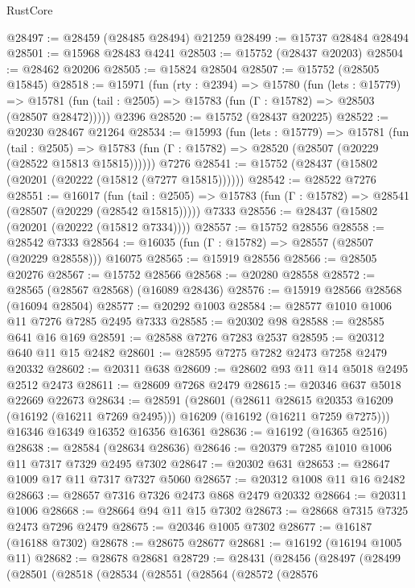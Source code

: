 \begin{lexlean}{RustCore}
\begin{coremodule}
@28497 := @28459 (@28485 @28494) @21259
@28499 := @15737 @28484 @28494
@28501 := @15968 @28483 @4241
@28503 := @15752 (@28437 @20203)
@28504 := @28462 @20206
@28505 := @15824 @28504
@28507 := @15752 (@28505 @15845)
@28518 := @15971
    (fun (rty : @2394) =>
    @15780
      (fun (lets : @15779) =>
      @15781 (fun (tail : @2505) => @15783 (fun (Γ : @15782) => @28503 (@28507 @28472)))))
    @2396
@28520 := @15752 (@28437 @20225)
@28522 := @20230 @28467 @21264
@28534 := @15993
    (fun (lets : @15779) =>
    @15781
      (fun (tail : @2505) =>
      @15783 (fun (Γ : @15782) => @28520 (@28507 (@20229 (@28522 @15813 @15815))))))
    @7276
@28541 := @15752 (@28437 (@15802 (@20201 (@20222 (@15812 (@7277 @15815))))))
@28542 := @28522 @7276
@28551 := @16017
    (fun (tail : @2505) => @15783 (fun (Γ : @15782) => @28541 (@28507 (@20229 (@28542 @15815)))))
    @7333
@28556 := @28437 (@15802 (@20201 (@20222 (@15812 @7334))))
@28557 := @15752 @28556
@28558 := @28542 @7333
@28564 := @16035 (fun (Γ : @15782) => @28557 (@28507 (@20229 @28558))) @16075
@28565 := @15919 @28556
@28566 := @28505 @20276
@28567 := @15752 @28566
@28568 := @20280 @28558
@28572 := @28565 (@28567 @28568) (@16089 @28436)
@28576 := @15919 @28566 @28568 (@16094 @28504)
@28577 := @20292 @1003
@28584 := @28577 @1010 @1006 @11 @7276 @7285 @2495 @7333
@28585 := @20302 @98
@28588 := @28585 @641 @16 @169
@28591 := @28588 @7276 @7283 @2537
@28595 := @20312 @640 @11 @15 @2482
@28601 := @28595 @7275 @7282 @2473 @7258 @2479 @20332
@28602 := @20311 @638
@28609 := @28602 @93 @11 @14 @5018 @2495 @2512 @2473
@28611 := @28609 @7268 @2479
@28615 := @20346 @637 @5018 @22669 @22673
@28634 := @28591
    (@28601
      (@28611 @28615 @20353 @16209 (@16192 (@16211 @7269 @2495)))
      @16209
      (@16192 (@16211 @7259 @7275)))
    @16346
    @16349
    @16352
    @16356
    @16361
@28636 := @16192 (@16365 @2516)
@28638 := @28584 (@28634 @28636)
@28646 := @20379 @7285 @1010 @1006 @11 @7317 @7329 @2495 @7302
@28647 := @20302 @631
@28653 := @28647 @1009 @17 @11 @7317 @7327 @5060
@28657 := @20312 @1008 @11 @16 @2482
@28663 := @28657 @7316 @7326 @2473 @868 @2479 @20332
@28664 := @20311 @1006
@28668 := @28664 @94 @11 @15 @7302
@28673 := @28668 @7315 @7325 @2473 @7296 @2479
@28675 := @20346 @1005 @7302
@28677 := @16187 (@16188 @7302)
@28678 := @28675 @28677
@28681 := @16192 (@16194 @1005 @11)
@28682 := @28678 @28681
@28729 := @28431
    (@28456
      (@28497
        (@28499
          (@28501
            (@28518
              (@28534
                (@28551
                  (@28564
                    (@28572
                      (@28576

\end{coremodule}
\end{lexlean}
